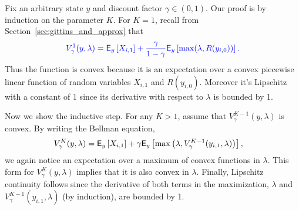 \begin{myproof}[Proof.]
	Fix an arbitrary state $y$ and discount factor $\gamma \in (0,1)$. Our proof is by induction on the parameter $K$. For $K = 1$, recall from Section~\ref{sec:gittins_and_approx} that
	\begin{align*}
	{\color{blue} V^1_\gamma(y, \lambda) = \ensuremath{\mathsf{E}}_y\left[X_{i,1} \right] +  \frac{\gamma}{1-\gamma} \ensuremath{\mathsf{E}}_y\left[\max(\lambda, R(y_{i,0}))\right].}
	\end{align*}
	Thus the function is convex because it is an expectation over a convex piecewise linear function of random variables $X_{i,1}$ and $R(y_{i,0})$.
	{\color{blue}Moreover it's Lipschitz with a constant of 1 since its derivative with respect to $\lambda$ is bounded by 1.}
	
	Now we show the inductive step. For any $K > 1$, assume that $V^{K-1}_\gamma(y, \lambda)$ is convex. By writing the Bellman equation,
	{\color{blue}
	\begin{align*}
	V^K_\gamma(y, \lambda) & = \mathsf{E}_y\left[X_{i,1}\right] + \gamma\mathsf{E}_y\left[\max\left(\lambda, V^{K-1}_\gamma(y_{i,1}, \lambda)\right) \right],
	\end{align*}
	}
	we again notice an expectation over a maximum of convex functions in $\lambda$. This form for $V^K_\gamma(y, \lambda)$ implies that  it is also convex in $\lambda$. %
	{\color{blue}Finally, Lipschitz continuity follows since the derivative of both terms in the maximization, $\lambda$ and $V^{K-1}_\gamma(y_{i,1}, \lambda)$ (by induction), are bounded by 1.}
\end{myproof}

